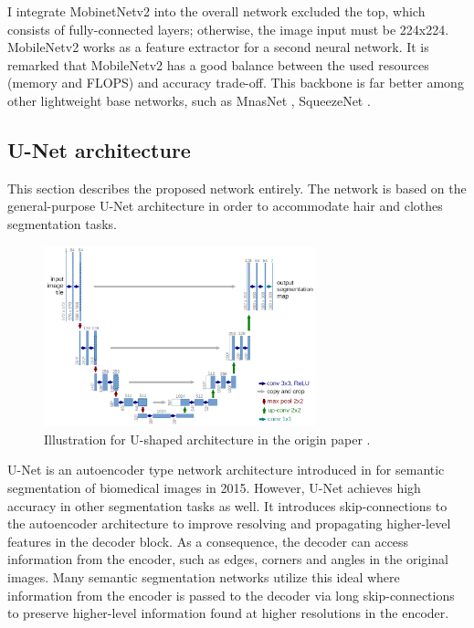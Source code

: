  
 I integrate MobinetNetv2 into the overall network excluded the top, which consists of fully-connected layers; otherwise, the image input must be 224x224. MobileNetv2 works as a feature extractor for a second neural network. It is remarked that MobileNetv2 has a good balance between the used resources (memory and FLOPS) and accuracy trade-off. This backbone is far better among other lightweight base networks, such as MnasNet \cite{mnasnet}, SqueezeNet \cite{squeezenet}.
 
 
 \subsection{U-Net architecture} \label{sec:unet}
 This section describes the proposed network entirely. The network is based on the general-purpose U-Net architecture in order to accommodate hair and clothes segmentation tasks. \par
 
 \begin{figure} [H]
     \centering
     \includegraphics[width=0.7\textwidth]{chapter3/image/u-net.png}
     \caption{Illustration for U-shaped architecture in the origin paper \cite{unet}.}
     \label{fig:unet1}
 \end{figure}
 
 U-Net is an autoencoder type network architecture introduced in \cite{unet} for semantic segmentation of biomedical images in 2015. However, U-Net achieves high accuracy in other segmentation tasks as well. It introduces skip-connections to the autoencoder architecture to improve resolving and propagating higher-level features in the decoder block.
As a consequence, the decoder can access information from the encoder, such as edges, corners and angles in the original images. Many semantic segmentation networks utilize this ideal where information from the encoder is passed to the decoder via long skip-connections to preserve higher-level information found at higher resolutions in the encoder. \par


